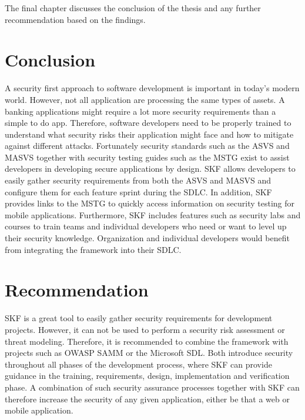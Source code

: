 The final chapter discusses the conclusion of the thesis and any further recommendation based on the findings.

\section{Conclusion}
A security first approach to software development is important in today's modern world. However, not all application are processing the same types of assets. A banking applications might require a lot more security requirements than a simple to do app. Therefore, software developers need to be properly trained to understand what security risks their application might face and how to mitigate against different attacks. Fortunately security standards such as the ASVS and MASVS together with security testing guides such as the MSTG exist to assist developers in developing secure applications by design. SKF allows developers to easily gather security requirements from both the ASVS and MASVS and configure them for each feature sprint during the SDLC. In addition, SKF provides links to the MSTG to quickly access information on security testing for mobile applications. Furthermore, SKF includes features such as security labs and courses to train teams and individual developers who need or want to level up their security knowledge. Organization and individual developers would benefit from integrating the framework into their SDLC.

\section{Recommendation}
SKF is a great tool to easily gather security requirements for development projects. However, it can not be used to perform a security risk assessment or threat modeling. Therefore, it is recommended to combine the framework with projects such as OWASP SAMM or the Microsoft SDL. Both introduce security throughout all phases of the development process, where SKF can provide guidance in the training, requirements, design, implementation and verification phase. A combination of such security assurance processes together with SKF can therefore increase the security of any given application, either be that a web or mobile application.
